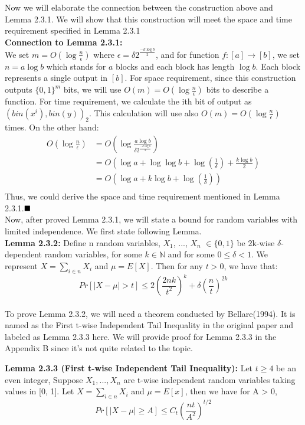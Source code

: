 \documentclass[a4paper, english]{paper}
\begin{document}
Now we will elaborate the connection between the construction above and Lemma 2.3.1. We will show that this construction will meet the space and time requirement specified in Lemma 2.3.1\\
\noindent\textbf{Connection to Lemma 2.3.1:}\\
We set $m=O(\log \frac n \epsilon)$ where $\epsilon = \delta 2^{\frac{-k\log b}2}$, and for function $f: [a]\rightarrow[b]$, we set $n=a\log b$ which stands for $a$ blocks and each block has length $\log b$. Each block represents a single output in $[b]$. For space requirement, since this construction outputs $\{0,1\}^m$ bits, we will use $O(m)=O(\log \frac n \epsilon)$ bits to describe a function. For time requirement, we calculate the ith bit of output as $(bin(x^i),bin(y))_2$. This calculation will use also $O(m)=O(\log \frac n \epsilon)$ times. On the other hand:
\begin{align*}
O(\log \frac n \epsilon) &= O(\log \frac{a\log b}{\delta 2^{\frac{-k\log b}2}})\\
&= O(\log a + \log\log b+\log(\frac1\delta)+\frac{k \log b}2)\\
&= O(\log a + k \log b+ \log(\frac1\delta))\\
\end{align*}
Thus, we could derive the space and time requirement mentioned in Lemma 2.3.1.$\hfill\blacksquare$ \\

 Now, after proved Lemma 2.3.1, we will state a bound for random variables with limited independence. We first state following Lemma.\\
\noindent\textbf{Lemma 2.3.2:} Define n random variables, $X_1$, ..., $X_n$ $\in \{0, 1\}$ be 2k-wise $\delta$-dependent random variables, for some $k \in \mathbb{N}$ and for some $0 \le \delta < 1$. We represent $X = \sum_{i \in n} X_i$  and $\mu = E[X]$. Then for any $t > 0$, we have that:
	$$ Pr[|X - \mu| > t] \le 2(\frac{2nk}{t^2})^k + \delta(\frac{n}{t})^{2k} $$\\
	
To prove Lemma 2.3.2, we will need a theorem conducted by Bellare(1994). It is named as the First t-wise Independent Tail Inequality in the original paper and labeled as Lemma 2.3.3 here. We will provide proof for Lemma 2.3.3 in the Appendix B since it's not quite related to the topic.

	\noindent\textbf{Lemma 2.3.3 (First t-wise Independent Tail Inequality):} Let $t \ge 4$ be an even integer, Suppose $X_1, ..., X_n$ are t-wise independent random variables taking values in [0, 1]. Let $X = \sum_{i \in n} X_i$ and $\mu = E[x]$, then we have for A > 0,
	$$Pr[|X-\mu| \ge A] \le C_t (\frac{nt}{A^2})^{t/2}$$
\end{document}
